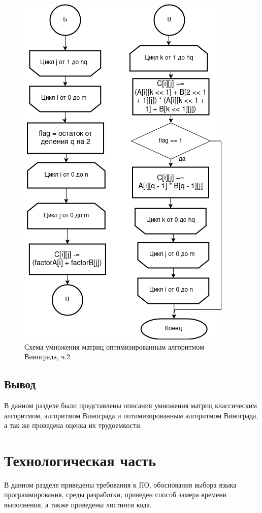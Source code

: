 \documentclass[12pt]{report}
\begin{document}
	\begin{figure}[H]
		\centering
		\includegraphics[width=0.75\linewidth]{opvin_2}
		\caption{Схема умножения матриц оптимизированным алгоритмом Винограда, ч.2}
		\label{fig:schema_selection}
	\end{figure}
	
	\section*{Вывод}
	
	В данном разделе были представлены описания умножения матриц классическим алгоритмом, алгоритмом Винограда и оптимизированным алгоритмом Винограда, а так же проведена оценка их трудоемкости.
	
	\chapter{Технологическая часть}
	
	В данном разделе приведены требования к ПО, обоснования выбора языка программирования, среды разработки, приведен способ замера времени выполнения, а также приведены листинги кода.
	
\end{document}
